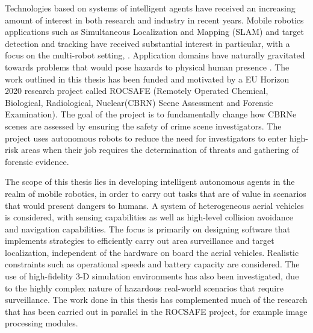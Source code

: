 
Technologies based on systems of intelligent agents have received an increasing amount of interest in both research and industry in recent years. Mobile robotics applications such as Simultaneous Localization and Mapping (SLAM)\cite{Thrun:2005:ProbabilisticRobotics} and target detection and tracking have received substantial interest in particular, with a focus on the multi-robot setting\cite{Saeedi2016Multiple-RobotReview}, \cite{Robin2016Multi-robotSurvey}. 
Application domains have naturally gravitated towards problems that would pose hazards to physical human presence \cite{Muller2014ApplicationSurvey}. The work outlined in this thesis has been funded and motivated by a EU Horizon 2020 research project called ROCSAFE (Remotely Operated Chemical, Biological, Radiological, Nuclear(CBRN) Scene Assessment and Forensic Examination)\cite{Bagherzadeh2017ROCSAFE:Incidents}. The goal of the project is to fundamentally change how CBRNe scenes are assessed by ensuring the safety of crime scene investigators. The project uses autonomous robots to reduce the need for investigators to enter high-risk areas when their job requires the determination of threats and gathering of  forensic evidence.\par

The scope of this thesis lies in developing intelligent autonomous agents in the realm of mobile robotics, in order to carry out tasks that are of value in scenarios that would present dangers to humans. A system of heterogeneous aerial vehicles is considered, with sensing capabilities as well as high-level collision avoidance and navigation capabilities. The focus is primarily on designing software that implements strategies to efficiently carry out area surveillance and target localization, independent of the hardware on board the aerial vehicles. Realistic constraints such as operational speeds and battery capacity are considered. The use of high-fidelity 3-D simulation environments has also been investigated, due to the highly complex nature of hazardous real-world scenarios that require surveillance. The work done in this thesis has complemented much of the research that has been carried out in parallel in the ROCSAFE project, for example image processing modules.\par